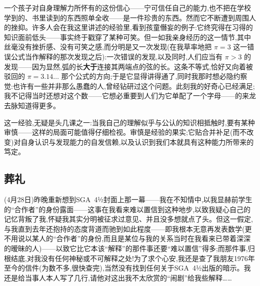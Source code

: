 一个孩子对自身理解力所怀有的这份信心——宁可信任自己的能力,也不把在学校学到的、书里读到的东西照单全收——是一件珍贵的东西。然而它不断遭到周围人的挫抑。许多人会在我这里讲述的经验里,看到孩童僭妄的例子:它终究得在习得的知识面前低头——事实终于戳穿了某种可笑。但一如我亲身经历的这一情节,其中丝毫没有挫折感、没有可笑之感,而分明是又一次发现(在我草率地把 $\pi=3$ 这一错误公式当作解释的那次发现之后):一次错误的发现,以及同时,人们应当有 $\pi>3$ 的发现——因为显然,弧的长\textbf{大于}连接其两端点的弦的长。这条不等式,恰好又向着被驳回的 $\pi=3.14\ldots$ 那个公式的方向;于是它显得讲得通了,同时我那时想必隐约察觉:也许有一些并非那么愚蠢的人,曾经钻研过这个问题。此刻我的好奇心已经满足;我不记得当时还想对这个数——它想必重要到人们为它单配了一个字母——的来龙去脉知道得更多。

\dmark{}这一经验,无疑是头几课之一:当我自己的理解似乎与公认的知识相抵触时,要有某种审慎——这样的局面可能值得仔细检视。审慎是经验的果实;它贴合并补足(而不改变)对自身认识与发现能力的自发信赖,以及认识到我们本就具有这种能力所带来的笃定。

\subsection{葬礼}


(4月28日)昨晚重新想到SGA~4½封面上那一幕——我在不知情中,以我显赫前学生的“合作者”的身份露面——这事在我看来难以置信到这种地步,以致我疑心自己的记忆背叛了我,怀疑我其实分明被征求过意见、并且没多想就点了头。但这一假定,与我直到去年还抱持的态度背道而驰到如此程度——即我根本无意再发表数学(更不用说以某人的“合作者”的身份,而且是某位与我的关系当时在我看来已带着深深的暧昧的人)——以致它比它本该“解释”的那件事还要“难以置信”得多;而那件事,归根结底,对我没有任何神秘或不可解释之处!为了求个心安,我还是查了我朋友1976年至今的信件(为数不多,很快查完),当然没有找到任何关于SGA~4½出版的暗示。我还是给当事人本人写了几行,请他对这出我不太欣赏的“闹剧”给我些解释……

